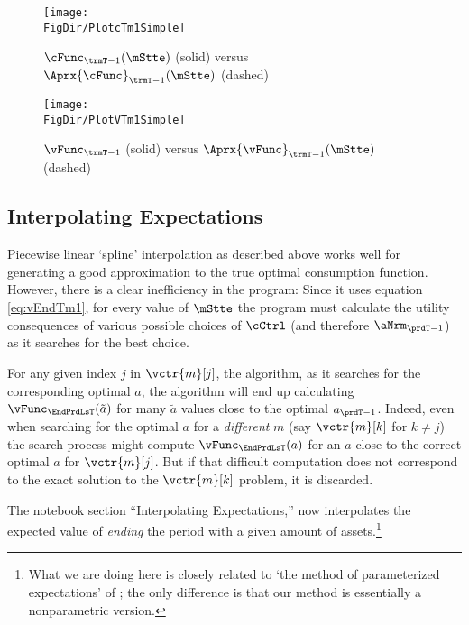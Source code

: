 \documentclass[\econtexRoot/SolvingMicroDSOPs]{subfiles}
\begin{document}
\hypertarget{PlotcTm1Simple}{}
\begin{figure}
  \centerline{\texttt{[image: \\FigDir/PlotcTm1Simple]}}
  \caption{$\cFunc_{\trmT-1}(\mStte)$ (solid) versus $\Aprx{\cFunc}_{\trmT-1}(\mStte)$ (dashed)}
  \label{fig:PlotcTm1Simple}
\end{figure}

\hypertarget{PlotvTm1Simple}{}
\begin{figure}
  \centerline{\texttt{[image: \\FigDir/PlotVTm1Simple]}}
  \caption{$\vFunc_{\trmT-1}$ (solid) versus $\Aprx{\vFunc}_{\trmT-1}(\mStte)$ (dashed)}
  \label{fig:PlotVTm1Simple}
\end{figure}


\hypertarget{interpolating-expectations}{}
\subsection{Interpolating Expectations}


Piecewise linear `spline' interpolation as described above works well for generating a good approximation to the true optimal consumption function. However, there is a clear inefficiency in the program: Since it uses equation \eqref{eq:vEndTm1}, for every value of $\mStte$ the program must calculate the utility consequences of various possible choices of $\cCtrl$ (and therefore $\aNrm_{\prdT-1}$) as it searches for the best choice.

For any given index $j$ in $\vctr{m}[j]$, the algorithm, as it searches for the corresponding optimal $a$, the algorithm will end up  calculating $\vFunc_{\EndPrdLsT}(\tilde{a})$ for many $\tilde{a}$ values close to the optimal ${a}_{\prdT-1}$.  Indeed, even when searching for the optimal ${a}$ for a \emph{different} ${m}$ (say $\vctr{m}[k]$ for $k \neq j$) the search process might compute $\vFunc_{\EndPrdLsT}({a})$ for an ${a}$ close to the correct optimal ${a}$ for $\vctr{m}[j]$. But if that difficult computation does not correspond to the exact solution to the $\vctr{m}[k]$ problem, it is discarded.  


The notebook section ``Interpolating Expectations,'' now interpolates the expected value of \textit{ending} the period with a given amount of assets.\footnote{What we are doing here is closely related to `the method of parameterized expectations' of \cite{denHaanMarcet:parameterized}; the only difference is that our method is essentially a nonparametric version.}  %
\end{document}
